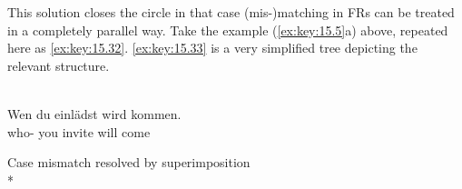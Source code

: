 \documentclass[output=paper]{langsci/langscibook}
\begin{document}
\begin{refcontext}
This solution closes the circle in that case (mis-)matching in \glspl{FR} can
be treated in a completely parallel way. Take the example (\ref{ex:key:15.5}a)
above, repeated here as \eqref{ex:key:15.32}. \eqref{ex:key:15.33} is a very
simplified tree depicting the relevant structure.

\ea\label{ex:key:15.32}\\
    \gll    Wen\tss{\Acc{}}     du  einlädst\textsuperscript{\Acc{}} wird kommen\textsuperscript{\Nom{}}.\\
            who-\Acc{} you invite          will   come\\
    \glt
\z

\ea\label{ex:key:15.33} Case mismatch resolved by superimposition\\*

\z


\end{refcontext}
\end{document}
